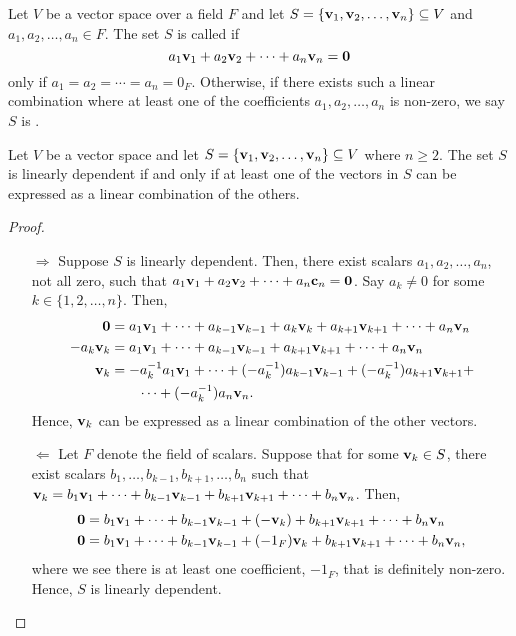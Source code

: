 \begin{defn}
Let $ V $ be a vector space over a field $ F $ and let $ S=\{\mathbf{v}_1,\mathbf{v}_2,\ldots,\mathbf{v}_n\}\subseteq V $ and $ a_1,a_2,\ldots,a_n\in F $. The set $ S $ is called  if
\begin{equation*}
    a_1\mathbf{v}_1+a_2\mathbf{v}_2+\cdots+a_n\mathbf{v}_n=\mathbf{0}
\end{equation*}
only if $ a_1=a_2=\cdots=a_n=0_F $. Otherwise, if there exists such a linear combination where at least one of the coefficients $ a_1,a_2,\ldots,a_n $ is non-zero, we say $ S $ is .
\end{defn}

\begin{thm}
Let $ V $ be a vector space and let $ S=\{\mathbf{v}_1,\mathbf{v}_2,\ldots,\mathbf{v}_n\}\subseteq V $ where $ n\geq 2 $. The set $ S $ is linearly dependent if and only if at least one of the vectors in $ S $ can be expressed as a linear combination of the others.
\end{thm}
\begin{proof}~
\begin{enumerate}
    \item[$ \Rightarrow $] Suppose $ S $ is linearly dependent. Then, there exist scalars $ a_1,a_2,\ldots,a_n $, not all zero, such that $ a_1\mathbf{v}_1+a_2\mathbf{v}_2+\cdots+a_n\mathbf{c}_n=\mathbf{0} $. Say $ a_k\neq 0 $ for some $ k\in\{1,2,\ldots,n\} $. Then,
    \begin{align*}
        \mathbf{0} &= a_1\mathbf{v}_1+\cdots+a_{k-1}\mathbf{v}_{k-1}+a_k\mathbf{v}_k+a_{k+1}\mathbf{v}_{k+1}+\cdots+a_n\mathbf{v}_n \\
        -a_k\mathbf{v}_k &= a_1\mathbf{v}_1+\cdots+a_{k-1}\mathbf{v}_{k-1}+a_{k+1}\mathbf{v}_{k+1}+\cdots+a_n\mathbf{v}_n \\
        \mathbf{v}_k &= -a_k^{-1}a_1\mathbf{v}_1+\cdots+(-a_k^{-1})a_{k-1}\mathbf{v}_{k-1}+(-a_k^{-1})a_{k+1}\mathbf{v}_{k+1}+ \\
        &\qquad \cdots+(-a_k^{-1})a_n\mathbf{v}_n.
    \end{align*}
    Hence, $ \mathbf{v}_k $ can be expressed as a linear combination of the other vectors.

    \item[$ \Leftarrow $] Let $ F $ denote the field of scalars. Suppose that for some $ \mathbf{v}_k\in S $, there exist scalars $ b_1,\ldots,b_{k-1},b_{k+1},\ldots,b_n $ such that $ \mathbf{v}_k=b_1\mathbf{v}_1+\cdots+b_{k-1}\mathbf{v}_{k-1}+b_{k+1}\mathbf{v}_{k+1}+\cdots+b_n\mathbf{v}_n $. Then,
    \begin{align*}
        \mathbf{0} &= b_1\mathbf{v}_1+\cdots+b_{k-1}\mathbf{v}_{k-1}+(-\mathbf{v}_k)+b_{k+1}\mathbf{v}_{k+1}+\cdots+b_n\mathbf{v}_n \\
        \mathbf{0} &= b_1\mathbf{v}_1+\cdots+b_{k-1}\mathbf{v}_{k-1}+(-1_F)\mathbf{v}_k+b_{k+1}\mathbf{v}_{k+1}+\cdots+b_n\mathbf{v}_n,
    \end{align*}
    where we see there is at least one coefficient, $ -1_F $, that is definitely non-zero. Hence, $ S $ is linearly dependent.\qedhere
\end{enumerate}
\end{proof}

